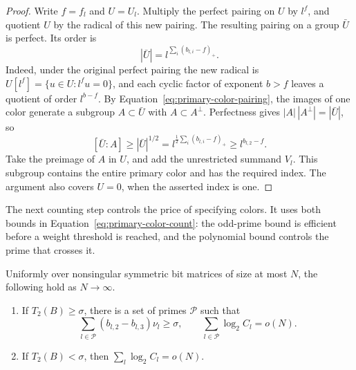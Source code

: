 \begin{proof}
Write \(f=f_l\) and \(U=U_l\). Multiply the perfect pairing on
\(U\) by \(l^f\), and quotient \(U\) by the radical of this
new pairing. The resulting pairing on a group \(\bar U\) is
perfect. Its order is
\[
 |\bar U|=l^{\sum_i(b_{l,i}-f)_+}.
\]
Indeed, under the original perfect pairing the new radical is
\(U[l^f]=\{u\in U:l^fu=0\}\), and each cyclic factor of exponent
\(b>f\) leaves a quotient of order \(l^{b-f}\).
By Equation~\eqref{eq:primary-color-pairing}, the images of one
color generate a subgroup \(A\subset\bar U\) with
\(A\subset A^\perp\). Perfectness gives
\(|A|\,|A^\perp|=|\bar U|\), so
\[
 [\bar U:A]\ge|\bar U|^{1/2}
 =l^{\frac12\sum_i(b_{l,i}-f)_+}
 \ge l^{b_{l,2}-f}.
\]
Take the preimage of \(A\) in \(U\), and add the unrestricted
summand \(V_l\). This subgroup contains the entire primary color
and has the required index. The argument also covers \(U=0\),
when the asserted index is one.
\end{proof}

The next counting step controls the price of specifying colors. It
uses both bounds in Equation~\eqref{eq:primary-color-count}: the
odd-prime bound is efficient before a weight threshold is reached,
and the polynomial bound controls the prime that crosses it.

\begin{lemma}\label{lem:color-cost}
Uniformly over nonsingular symmetric bit matrices of size at most
\(N\), the following hold as \(N\to\infty\).
\begin{enumerate}[label=\textup{(\roman*)}]
 \item If \(T_2(B)\ge\sigma\), there is a set of primes
 \(\mathcal P\) such that
 \[
  \sum_{l\in\mathcal P}(b_{l,2}-b_{l,3})\nu_l\ge\sigma,
  \qquad \sum_{l\in\mathcal P}\log_2 C_l=o(N).
 \]
 \item If \(T_2(B)<\sigma\), then
 \(\sum_l\log_2 C_l=o(N)\).
\end{enumerate}
\end{lemma}

